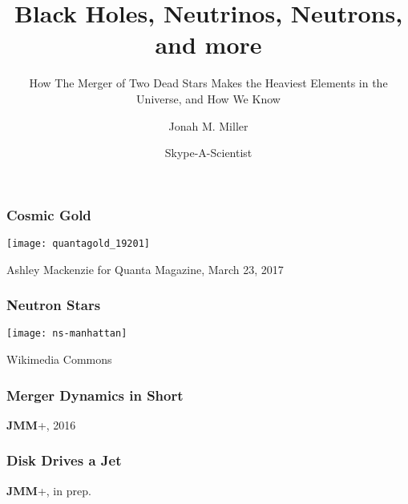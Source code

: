 \documentclass[]{beamer}
\title[SKype A Scientist]{Black Holes, Neutrinos, Neutrons, and more}
\subtitle{How The Merger of Two Dead Stars Makes the Heaviest Elements
  in the Universe, and How We Know}
\author[J. Miller]{Jonah M. Miller}
\institute[LANL]{Los Alamos National Laboratory}
\date[11/03/19]{Skype-A-Scientist}
\begin{document}
\begin{frame}[plain]
\titlepage
\end{frame}

\begin{frame}
  \frametitle{Cosmic Gold}
  \begin{center}
    \texttt{[image: quantagold\_19201]}
  \end{center}
  Ashley Mackenzie for Quanta Magazine, March 23, 2017
\end{frame}

\begin{frame}
  \frametitle{Neutron Stars}
  \begin{center}
    \texttt{[image: ns-manhattan]}
  \end{center}
  Wikimedia Commons
\end{frame}


\begin{frame}
  \frametitle{Merger Dynamics in Short}
  \begin{center}
  \end{center}
    \textbf{JMM}+, 2016
\end{frame}


\begin{frame}
  \frametitle{Disk Drives a Jet}
  \begin{center}
  \end{center}
  \textbf{JMM}+, in prep.
\end{frame}
\end{document}
